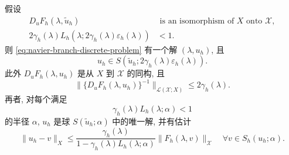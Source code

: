 \setcounter{statement}{0}
\begin{Theorem}\label{thm:navier-branch-local-existence-error}
假设
\begin{align}
D_uF_h(\lambda,\widetilde u_h)&
\text{ is an isomorphism of }X\text{ onto }\mathscr X,
\label{eq:navier-branch-local-isomorphism}\\
2\gamma_h(\lambda)L_h(\lambda;2\gamma_h(\lambda)\varepsilon_h(\lambda))&<1.
\label{eq:navier-branch-local-contraction}
\end{align}
则 \eqref{eq:navier-branch-discrete-problem} 有一个解 $(\lambda,u_h)$, 且
\begin{equation}\label{eq:navier-branch-local-ball}
u_h\in S(\widetilde u_h;2\gamma_h(\lambda)\varepsilon_h(\lambda)).
\end{equation}
此外 $D_uF_h(\lambda,u_h)$ 是从 $X$ 到 $\mathscr X$ 的同构, 且
\begin{equation}\label{eq:navier-branch-solution-inverse-bound}
\|\{D_uF_h(\lambda,u_h)\}^{-1}\|_{\mathcal L(\mathscr X;X)}
\leq2\gamma_h(\lambda).
\end{equation}
再者, 对每个满足
\begin{equation}\label{eq:navier-branch-uniqueness-radius}
\gamma_h(\lambda)L_h(\lambda;\alpha)<1
\end{equation}
的半径 $\alpha$, $u_h$ 是球 $S(\widetilde u_h;\alpha)$ 中的唯一解, 并有估计
\begin{equation}\label{eq:navier-branch-fundamental-error}
\|u_h-v\|_X
\leq\frac{\gamma_h(\lambda)}
{1-\gamma_h(\lambda)L_h(\lambda;\alpha)}
\|F_h(\lambda,v)\|_{\mathscr X}
\quad\forall v\in S_h(u_h;\alpha).
\end{equation}
\end{Theorem}
